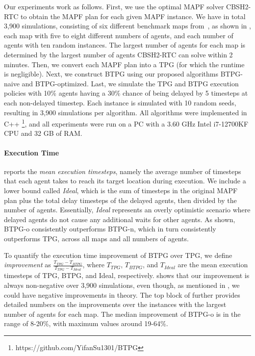 \documentclass[letterpaper]{article} %
\theoremstyle{definition}
\begin{document}
Our experiments work as follows. First, we use the optimal MAPF solver CBSH2-RTC \cite{li_pairwise_2021} to obtain the MAPF plan for each given MAPF instance. We have in total 3,900 simulations, consisting of six different benchmark maps from~\cite{stern_multi-agent_2021}, as shown in , each map with five to eight different numbers of agents, and each number of agents with ten random instances. The largest number of agents for each map is determined by the largest number of agents CBSH2-RTC can solve within 2 minutes.
Then, we convert each MAPF plan into a TPG (for which the runtime is negligible).
Next, we construct BTPG using our proposed algorithms BTPG-naive and BTPG-optimized. Last, we simulate the TPG and BTPG execution policies with 10\% agents having a 30\% chance of being delayed by 5 timesteps at each non-delayed timestep. Each instance is simulated with 10 random seeds, resulting in 3,900 simulations per algorithm.
All algorithms were implemented in C++ \footnote{https://github.com/YifanSu1301/BTPG}, and all experiments were run on a PC with a 3.60 GHz Intel i7-12700KF CPU and 32 GB of RAM.


\paragraph{Execution Time}  reports the \emph{mean execution timesteps}, namely the average number of timesteps that each agent takes to reach its target location during execution. We include a lower bound called \emph{Ideal}, which is the sum of timesteps in the original MAPF plan plus the total delay timesteps of the delayed agents, then divided by the number of agents. Essentially, \emph{Ideal} represents an overly optimistic scenario where delayed agents do not cause any additional waits for other agents. As shown, BTPG-o consistently outperforms BTPG-n, which in turn consistently outperforms TPG, across all maps and all numbers of agents.

To quantify the execution time improvement of BTPG over TPG, we define \emph{improvement} as $\frac{T_{TPG} - T_{BTPG}}{T_{TPG}-T_{Ideal}}$, where $T_{TPG}$, $T_{BTPG}$, and $T_{Ideal}$ are the mean execution timesteps of TPG, BTPG, and Ideal, respectively.  shows that our improvement is always non-negative over 3,900 simulations, even though, as mentioned in , we could have negative improvements in theory. The top block of  further provides detailed numbers on the improvements over the instances with the largest number of agents for each map. The median improvement of BTPG-o is in the range of 8-20\%, with maximum values around 19-64\%.
\end{document}
